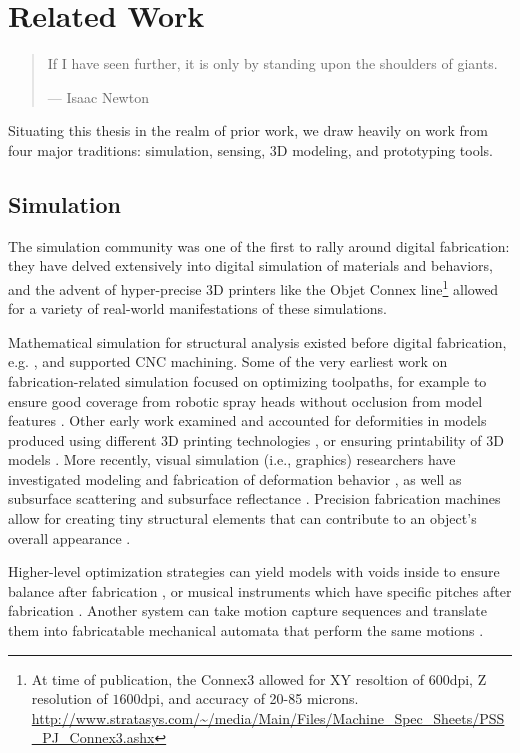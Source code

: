 \chapter{Related Work}

\begin{quote}
If I have seen further, it is only by standing upon the shoulders of giants.

--- Isaac Newton
\end{quote}

Situating this thesis in the realm of prior work, we draw heavily on work from four major traditions: simulation, sensing, 3D modeling, and prototyping tools.

\section{Simulation}

    The simulation community was one of the first to rally around digital fabrication: they have delved extensively into digital simulation of materials and behaviors, and the advent of hyper-precise 3D printers like the Objet Connex line\footnote{At time of publication, the Connex3 allowed for XY resoltion of $600$dpi, Z resolution of $1600$dpi, and accuracy of 20-85 microns. \url{http://www.stratasys.com/~/media/Main/Files/Machine_Spec_Sheets/PSS_PJ_Connex3.ashx}} allowed for a variety of real-world manifestations of these simulations.
    
    Mathematical simulation for structural analysis existed before digital fabrication, e.g. \cite{fleury-optimization}, and supported CNC machining. Some of the very earliest work on fabrication-related simulation focused on optimizing toolpaths, for example to ensure good coverage from robotic spray heads without occlusion from model features \cite{gursoz-noodles}. Other early work examined and accounted for deformities in models produced using different 3D printing technologies \cite{brown-simulate,hsu-numerical}, or ensuring printability of 3D models \cite{barequet-gaps,bohn-shellclosure}. More recently, visual simulation (i.e., graphics) researchers have investigated modeling and fabrication of deformation behavior \cite{bickel-deformation}, as well as subsurface scattering \cite{hasan-subsurface} and subsurface reflectance \cite{weyrich-reflectance}. Precision fabrication machines allow for creating tiny structural elements that can contribute to an object's overall appearance \cite{lan-appearance}.
    
    Higher-level optimization strategies can yield models with voids inside to ensure balance after fabrication \cite{prevost-makeitstand}, or musical instruments which have specific pitches after fabrication \cite{umetani-metallophone}. Another system can take motion capture sequences and translate them into fabricatable mechanical automata that perform the same motions \cite{ceylan-automata}.
    
